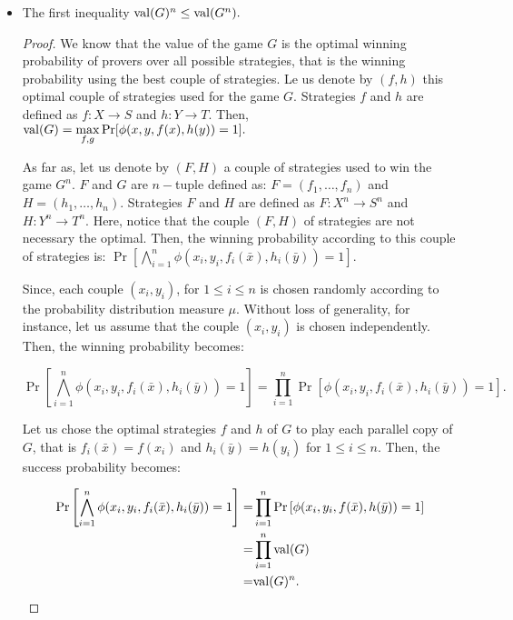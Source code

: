 \begin{itemize}
\item The first inequality $\mathrm{val} (G)^n \leq \mathrm{val} (G^n) .$

\begin{proof}
We know that the value of the game $G$ is the optimal winning probability of provers over all possible strategies, that is the winning probability using the best couple of strategies. Le us denote by $(f,h)$ this optimal couple of strategies used for the game $G$. Strategies $f$ and $h$ are  defined as $f: X\longrightarrow S$ and  $h: Y\longrightarrow T.$  Then, $\mathrm{val} (G)= \max\limits_{f,g} \Pr[\phi(x,y,f(x),h(y))=1].$

As far as, let us denote by $(F,H)$ a couple of strategies  used  to win the game $G^n$. $F$ and $G$ are $n-$tuple defined as: $F=(f_1, \ldots, f_n)$ and  $H=(h_1, \ldots, h_n)$. Strategies $F$ and $H$ are  defined as $F: X^n\longrightarrow S^n$ and  $H: Y^n\longrightarrow T^n.$ Here, notice that the couple $(F,H)$ of strategies are not necessary the optimal.
Then, the winning probability according to this couple of strategies is: $\Pr \left[\bigwedge\limits_{i=1}^n \phi (x_i,y_i, f_i(\bar{x}), h_i(\bar{y}))=1 \right].$

Since, each couple $(x_i,y_i)$, for $ 1\leq i \leq n$ is chosen randomly  according to the  probability distribution measure $\mu$. Without loss of generality, for instance, let us assume that the couple $(x_i,y_i)$ is chosen independently. Then, the winning probability becomes: 

$$\Pr \left[\bigwedge\limits_{i=1}^n \phi (x_i,y_i, f_i(\bar{x}), h_i(\bar{y}))=1 \right]= \prod\limits_{i=1}^n \Pr \left[ \phi (x_i,y_i, f_i(\bar{x}), h_i(\bar{y}))=1 \right].$$


Let us chose the optimal strategies $f$ and $h$ of $G$ to play each parallel copy of $G$, that is $f_i (\bar{x})=f(x_i)$ and $h_i (\bar{y})=h (y_i)$ for $ 1\leq i \leq n$. Then, the success probability becomes:

\begin{align*}
\Pr \left[\bigwedge\limits_{i=1}^n \phi (x_i,y_i, f_i(\bar{x}), h_i(\bar{y}))=1 \right] = &   \prod\limits_{i=1}^n \Pr \left[ \phi (x_i,y_i, f(\bar{x}), h(\bar{y}))=1 \right] \\
= & \prod\limits_{i=1}^n \mathrm{val} (G) \\
= & \mathrm{val} (G)^n.
\end{align*}


\end{proof}
\end{itemize}
